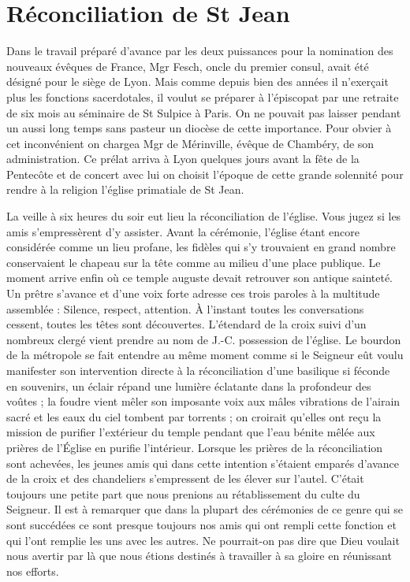 \section*{Réconciliation de St Jean}
Dans le travail préparé d'avance par les deux puissances pour la nomination des nouveaux évêques de France, Mgr Fesch, oncle du premier consul, avait été désigné pour le siège de Lyon. Mais comme depuis bien des années il n'exerçait plus les fonctions sacerdotales, il voulut se préparer à l'épiscopat par une retraite de six mois au séminaire de St Sulpice à Paris. On ne pouvait pas laisser pendant un aussi long temps sans pasteur un diocèse de cette importance. Pour obvier à cet inconvénient on chargea Mgr de Mérinville, évêque de Chambéry, de son administration. Ce prélat arriva à Lyon quelques jours avant la fête de la Pentecôte et de concert avec lui on choisit l'époque de cette grande solennité pour rendre à la religion l'église primatiale de St Jean.

La veille à six heures du soir eut lieu la réconciliation de l'église. Vous jugez si les amis s'empressèrent d'y assister.
Avant la cérémonie, l'église étant encore considérée comme un lieu profane, les fidèles qui s'y trouvaient en grand nombre conservaient le chapeau sur la tête comme au milieu d'une place publique. Le moment arrive enfin où ce temple auguste devait retrouver son antique sainteté. Un prêtre s'avance et d'une voix forte adresse ces trois paroles à la multitude assemblée : Silence, respect, attention. À l'instant toutes les conversations cessent, toutes les têtes sont découvertes. L'étendard de la croix suivi d'un nombreux clergé vient prendre au nom de J.-C. possession de l'église. Le bourdon de la métropole se fait entendre au même moment comme si le Seigneur eût voulu manifester son intervention directe à la réconciliation d'une basilique si féconde en souvenirs, un éclair répand une lumière éclatante dans la profondeur des voûtes ; la foudre vient mêler son imposante voix aux mâles vibrations de l'airain sacré et les eaux du ciel tombent par torrents ; on croirait qu'elles ont reçu la mission de purifier l'extérieur du temple pendant que l'eau bénite mêlée aux prières de l'Église en purifie l'intérieur. Lorsque les prières de la réconciliation sont achevées, les jeunes amis qui dans cette intention s'étaient emparés d'avance de la croix et des chandeliers s'empressent de les élever sur l'autel. C'était toujours une petite part que nous prenions au rétablissement du culte du Seigneur. Il est à remarquer que dans la plupart des cérémonies
de ce genre qui se sont succédées ce sont presque toujours nos amis qui ont rempli cette fonction et qui l'ont remplie les uns avec les autres. Ne pourrait-on pas dire que Dieu voulait nous avertir par là que nous étions destinés à travailler à sa gloire en réunissant nos efforts.

